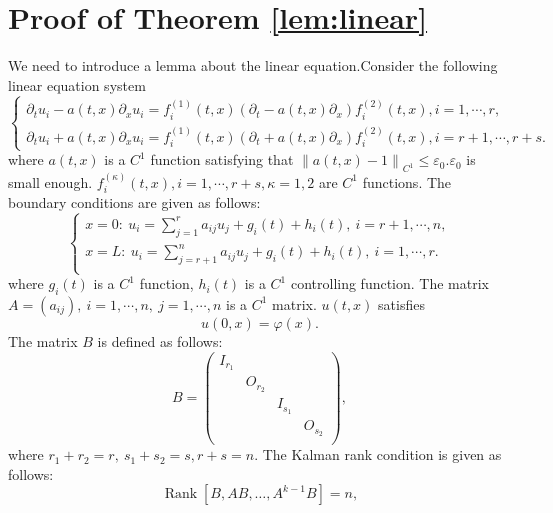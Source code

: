 \documentclass[a4paper,reqno,11pt]{amsart}
\numberwithin{equation}{section} %
\begin{document}
\section{Proof of Theorem \ref{lem:linear}}
We need to introduce a lemma about the linear equation.Consider the following linear equation system
\begin{equation}\label{e1}
	\left\{\begin{array}{l}
	\partial_t u_i- a(t,x)\partial_x u_i=f^{(1)}_i(t,x)(\partial_t - a(t,x)\partial_x)f^{(2)}_i(t,x), i=1, \cdots, r, \\
	\partial_t u_i+ a(t,x)\partial_x u_i=f^{(1)}_i(t,x)(\partial_t + a(t,x)\partial_x)f^{(2)}_i(t,x), i=r+1, \cdots, r+s.
	\end{array}\right.
\end{equation}
where $a(t,x)$ is a $C^1$ function satisfying that $\left\lVert a(t,x)-1\right\rVert _{C^1} \leq \varepsilon _0$.$\varepsilon _0$ is small enough. $f^{(\kappa )}_i(t,x),i=1,\cdots,r+s,\kappa =1,2$ are $C^1$ functions. The boundary conditions are given as follows:
\begin{equation}\label{e2}
	\left\{ \begin{array}{l}
		x=0:\ u_i=\sum_{j=1}^r{a_{ij}u_j + g_i(t) + h_i\left( t \right) ,\ i=r+1,\cdots ,n,}\\
		x=L:\ u_i=\sum_{j=r+1}^n{a_{ij}u_j +g_i(t) + h_i\left( t \right) ,\ i=1,\cdots ,r.}\\
	\end{array} \right. 
\end{equation}
where $g_i(t)$ is a $C^1$ function, $h_i(t)$ is a $C^1$ controlling function. The matrix $A=\left( a_{ij} \right) ,\ i=1,\cdots ,n,\ j=1,\cdots ,n$ is a $C^1$ matrix. $u(t,x)$ satisfies
\begin{equation}\label{4}
	u\left( 0,x \right) =\varphi \left( x \right) .
\end{equation}
The matrix $B$ is defined as follows:
$$
B=\left( \begin{matrix}
	I_{r_1}&		&		&		\\
	&		O_{r_2}&		&		\\
	&		&		I_{s_1}&		\\
	&		&		&		O_{s_2}\\
\end{matrix} \right) ,
$$
where $r_1 +r_2 =r,\ s_1+s_2=s, r+s=n $. The Kalman rank condition is given as follows:
\begin{equation}\label{kalman}
	\operatorname{Rank}\left[B, AB, \ldots, A^{k-1} B\right]=n,
\end{equation}
\end{document}
